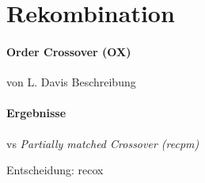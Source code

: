\section{Rekombination}\label{recombination}


\paragraph{Order Crossover (OX)} von L. Davis
Beschreibung

\paragraph{Ergebnisse}
vs \emph{Partially matched Crossover (recpm)}


Entscheidung: recox

